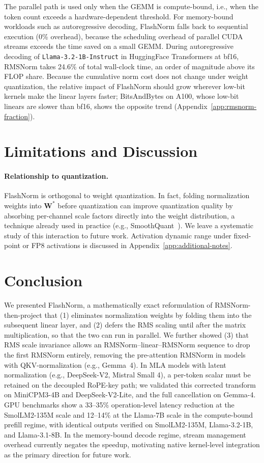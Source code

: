 \documentclass{article}
\begin{document}
The parallel path is used only when the GEMM is compute-bound, i.e., when the token count exceeds a hardware-dependent threshold. For memory-bound workloads such as autoregressive decoding, FlashNorm falls back to sequential execution (0\% overhead), because the scheduling overhead of parallel CUDA streams exceeds the time saved on a small GEMM. During autoregressive decoding of \texttt{Llama-3.2-1B-Instruct} in HuggingFace Transformers at bf16, RMSNorm takes 24.6\% of total wall-clock time, an order of magnitude above its FLOP share. Because the cumulative norm cost does not change under weight quantization, the relative impact of FlashNorm should grow wherever low-bit kernels make the linear layers faster; BitsAndBytes on A100, whose low-bit linears are slower than bf16, shows the opposite trend (Appendix~\ref{app:rmsnorm-fraction}).

\section{Limitations and Discussion}\label{sec:limitations-discussion}

\paragraph{Relationship to quantization.}
FlashNorm is orthogonal to weight quantization. In fact, folding normalization
weights into $\mathbf{W}^*$ before quantization can improve quantization quality
by absorbing per-channel scale factors directly into the weight distribution,
a technique already used in practice (e.g., SmoothQuant~\citep{smoothQuant}). We leave a systematic
study of this interaction to future work. Activation dynamic range under fixed-point or
FP8 activations is discussed in Appendix~\ref{app:additional-notes}.

\section{Conclusion}
We presented FlashNorm, a mathematically exact reformulation of RMSNorm-then-project
that (1) eliminates normalization weights by folding them into the subsequent linear
layer, and (2) defers the RMS scaling until after the matrix multiplication,
so that the two can run in parallel.
We further showed (3) that RMS scale invariance allows an RMSNorm--linear--RMSNorm sequence
to drop the first RMSNorm entirely,
removing the pre-attention RMSNorm in models with QKV-normalization (e.g., Gemma~4).
In MLA models with latent normalization (e.g., DeepSeek-V2, Mistral Small 4), a per-token
scalar must be retained on the decoupled RoPE-key path; we validated this corrected
transform on MiniCPM3-4B and DeepSeek-V2-Lite, and the full cancellation on Gemma-4.
GPU benchmarks show a 33--35\% operation-level latency reduction at
the SmolLM2-135M scale and 12--14\% at the Llama-7B scale
in the compute-bound prefill regime, with identical outputs verified on
SmolLM2-135M, Llama-3.2-1B, and Llama-3.1-8B.
In the memory-bound decode regime, stream management overhead
currently negates the speedup, motivating native kernel-level integration as the
primary direction for future work.
\end{document}
